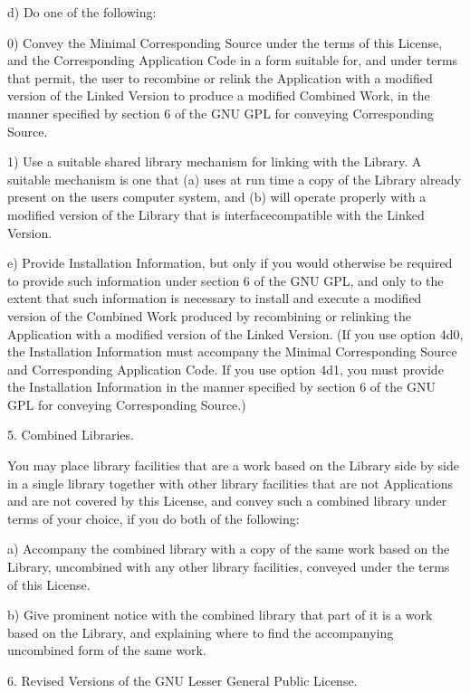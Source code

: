\documentclass[letterpaper,10pt,english]{sphinxmanual}
\begin{document}
\begin{sphinxVerbatim}[commandchars=\\\{\}]
    d) Do one of the following:

        0) Convey the Minimal Corresponding Source under the terms of this
        License, and the Corresponding Application Code in a form suitable
        for, and under terms that permit, the user to recombine or relink
        the Application with a modified version of the Linked Version to
        produce a modified Combined Work, in the manner specified by section 6
        of the GNU GPL for conveying Corresponding Source.

        1) Use a suitable shared library mechanism for linking with the
        Library. A suitable mechanism is one that (a) uses at run time a
        copy of the Library already present on the user\PYGZsq{}s computer system,
        and (b) will operate properly with a modified version of the Library
        that is interface\PYGZhy{}compatible with the Linked Version.

    e) Provide Installation Information, but only if you would otherwise be
    required to provide such information under section 6 of the GNU GPL, and
    only to the extent that such information is necessary to install and
    execute a modified version of the Combined Work produced by recombining
    or relinking the Application with a modified version of the Linked Version.
    (If you use option 4d0, the Installation Information must accompany the
    Minimal Corresponding Source and Corresponding Application Code. If you
    use option 4d1, you must provide the Installation Information in the
    manner specified by section 6 of the GNU GPL for
    conveying Corresponding Source.)

5. Combined Libraries.

You may place library facilities that are a work based on the Library side by
side in a single library together with other library facilities that are not
Applications and are not covered by this License, and convey such a combined
library under terms of your choice, if you do both of the following:

    a) Accompany the combined library with a copy of the same work based on
    the Library, uncombined with any other library facilities, conveyed under
    the terms of this License.

    b) Give prominent notice with the combined library that part of it is a
    work based on the Library, and explaining where to find the accompanying
    uncombined form of the same work.

6. Revised Versions of the GNU Lesser General Public License.


\end{sphinxVerbatim}
\end{document}
